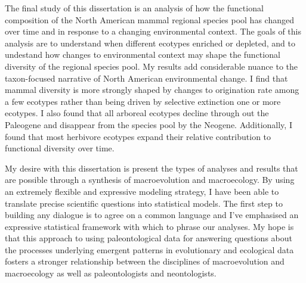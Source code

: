 The final study of this dissertation is an analysis of how the functional composition of the North American mammal regional species pool has changed over time and in response to a changing environmental context. The goals of this analysis are to understand when different ecotypes enriched or depleted, and to undestand how changes to environmental context may shape the functional diversity of the regional species pool. My results add considerable nuance to the taxon-focused narrative of North American environmental change. I find that mammal diversity is more strongly shaped by changes to origination rate among a few ecotypes rather than being driven by selective extinction one or more ecotypes. I also found that all arboreal ecotypes decline through out the Paleogene and disappear from the species pool by the Neogene. Additionally, I found that most herbivore ecotypes expand their relative contribution to functional diversity over time. 


My desire with this dissertation is present the types of analyses and results that are possible through a synthesis of macroevolution and macroecology. By using an extremely flexible and expressive modeling strategy, I have been able to translate precise scientific questions into statistical models. The first step to building any dialogue is to agree on a common language and I've emphasised an expressive statistical framework with which to phrase our analyses. My hope is that this approach to using paleontological data for answering questions about the processes underlying emergent patterns in evolutionary and ecological data fosters a stronger relationship between the disciplines of macroevolution and macroecology as well as paleontologists and neontologists.
